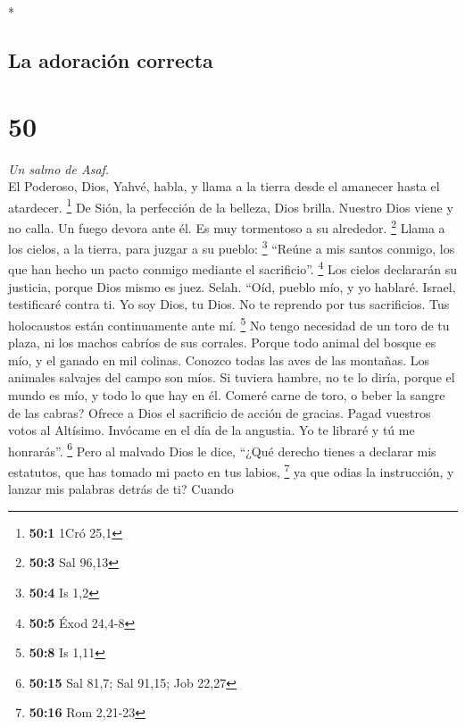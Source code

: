\begin{paracol}{2}
\begin{otherlanguage}{english}
\end{otherlanguage}

\switchcolumn[0]*

\hypertarget{la-adoraciuxf3n-correcta}{%
\subsection{La adoración correcta}\label{la-adoraciuxf3n-correcta}}

\hypertarget{section-98}{%
\section{50}\label{section-98}}

\emph{Un salmo de Asaf.}\\
 El Poderoso, Dios, Yahvé, habla, y llama a la tierra
desde el amanecer hasta el atardecer. \footnote{\textbf{50:1} 1Cró 25,1}
 De Sión, la perfección de la belleza, Dios brilla.
 Nuestro Dios viene y no calla. Un fuego devora ante él.
Es muy tormentoso a su alrededor. \footnote{\textbf{50:3} Sal 96,13}
 Llama a los cielos, a la tierra, para juzgar a su pueblo:
\footnote{\textbf{50:4} Is 1,2}  ``Reúne a mis santos
conmigo, los que han hecho un pacto conmigo mediante el sacrificio''.
\footnote{\textbf{50:5} Éxod 24,4-8}  Los cielos
declararán su justicia, porque Dios mismo es juez. Selah. 
``Oíd, pueblo mío, y yo hablaré. Israel, testificaré contra ti. Yo soy
Dios, tu Dios.  No te reprendo por tus sacrificios. Tus
holocaustos están continuamente ante mí. \footnote{\textbf{50:8} Is 1,11}
 No tengo necesidad de un toro de tu plaza, ni los machos
cabríos de sus corrales.  Porque todo animal del bosque
es mío, y el ganado en mil colinas.  Conozco todas las
aves de las montañas. Los animales salvajes del campo son míos.
 Si tuviera hambre, no te lo diría, porque el mundo es
mío, y todo lo que hay en él.  Comeré carne de toro, o
beber la sangre de las cabras?  Ofrece a Dios el
sacrificio de acción de gracias. Pagad vuestros votos al Altísimo.
 Invócame en el día de la angustia. Yo te libraré y tú me
honrarás''. \footnote{\textbf{50:15} Sal 81,7; Sal 91,15; Job 22,27}
 Pero al malvado Dios le dice, ``¿Qué derecho tienes a
declarar mis estatutos, que has tomado mi pacto en tus labios,
\footnote{\textbf{50:16} Rom 2,21-23}  ya que odias la
instrucción, y lanzar mis palabras detrás de ti?  Cuando

\end{paracol}

